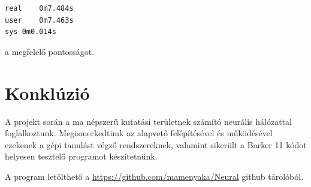 \documentclass[a4paper]{article}
\begin{document}
\lstset{language=Bash}
\begin{lstlisting}
real	0m7.484s
user	0m7.463s
sys	0m0.014s
\end{lstlisting}

a megfelelő pontosságot.

\section{Konklúzió}
A projekt során a ma népszerű kutatási területnek számító neurális hálózattal foglalkoztunk. Megismerkedtünk az alapvető felépítésével és működésével ezekenek a gépi tanulást végző rendszereknek, valamint sikerült a Barker 11 kódot helyesen tesztelő programot készítetnünk.

A program letölthető a \url{https://github.com/mamenyaka/Neural} github tárolóból.
\end{document}
